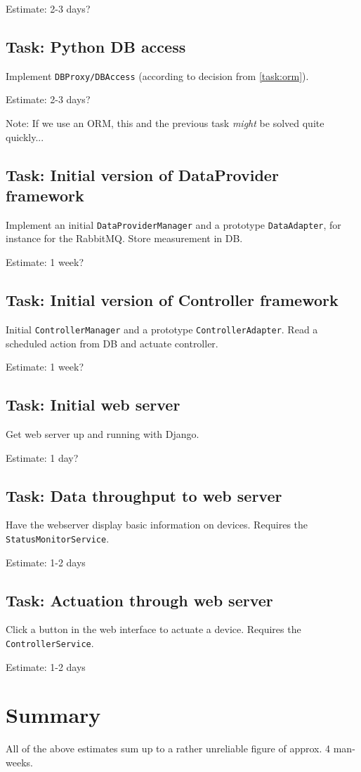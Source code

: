 Estimate: 2-3 days?

\subsection{Task: Python DB access}
Implement \texttt{DBProxy/DBAccess} (according to decision from \ref{task:orm}). 

Estimate: 2-3 days?

Note: If we use an ORM, this and the previous task \emph{might} be solved quite quickly...

\subsection{Task: Initial version of DataProvider framework}
Implement an initial \texttt{DataProviderManager} and a prototype \texttt{DataAdapter}, for instance for the RabbitMQ. Store measurement in DB.

Estimate: 1 week?

\subsection{Task: Initial version of Controller framework}
Initial \texttt{ControllerManager} and a prototype \texttt{ControllerAdapter}. Read a scheduled action from DB and actuate controller.

Estimate: 1 week?

\subsection{Task: Initial web server}
Get web server up and running with Django.

Estimate: 1 day?

\subsection{Task: Data throughput to web server}
Have the webserver display basic information on devices. Requires the \texttt{StatusMonitorService}.

Estimate: 1-2 days

\subsection{Task: Actuation through web server}
Click a button in the web interface to actuate a device. Requires the \texttt{ControllerService}.

Estimate: 1-2 days

\section{Summary}
All of the above estimates sum up to a rather unreliable figure of approx. 4 man-weeks. 